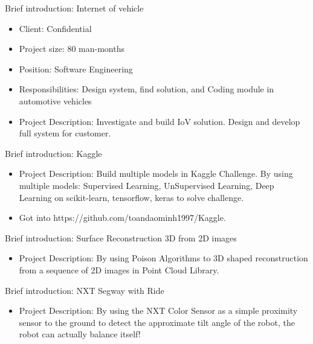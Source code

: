 \documentclass{resume}
\begin{document}
Brief introduction: Internet of vehicle
\begin{itemize}
  \item Client: Confidential
  \item Project size: 80 man-months
  \item Position: Software Engineering
  \item Responsibilities: Design system, find solution, and Coding module in automotive vehicles
  \item Project Description: Investigate and build IoV solution. Design and develop full system for customer.
\end{itemize}

Brief introduction: Kaggle
\begin{itemize}
  \item Project Description: Build multiple models in Kaggle Challenge. By using multiple models: Supervised Learning, UnSupervised Learning, Deep Learning on scikit-learn, tensorflow, keras to solve challenge.
  \item Got into https://github.com/toandaominh1997/Kaggle.
\end{itemize}

Brief introduction: Surface Reconstruction 3D from 2D images
\begin{itemize}
  \item Project Description: By using Poison Algorithms to 3D shaped reconstruction from a sequence of 2D images in Point Cloud Library.
\end{itemize}

Brief introduction: NXT Segway with Ride
\begin{itemize}
  \item Project Description: By using the NXT Color Sensor as a simple proximity sensor to the
ground to detect the approximate tilt angle of the robot, the robot can actually balance
itself!
\end{itemize}
\end{document}
